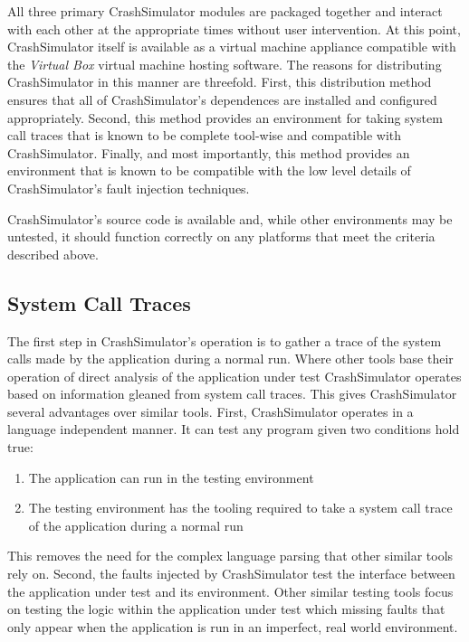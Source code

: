         All three primary CrashSimulator modules are packaged together and interact with each other at the appropriate
        times without user intervention. At this point, CrashSimulator itself is available as a virtual machine
        appliance compatible with the \emph{Virtual Box} virtual machine hosting software. The reasons for distributing
        CrashSimulator in this manner are threefold. First, this distribution method ensures that all of
        CrashSimulator's dependences are installed and configured appropriately. Second, this method provides an
        environment for taking system call traces that is known to be complete tool-wise and compatible with
        CrashSimulator. Finally, and most importantly, this method provides an environment that is known to be
        compatible with the low level details of CrashSimulator's fault injection techniques.

        CrashSimulator's source code is available and, while other environments may be untested, it should function
        correctly on any platforms that meet the criteria described above.

    \subsection{System Call Traces}


        The first step in CrashSimulator's operation is to gather a trace of the system calls made by the application
        during a normal run. Where other tools base their operation of direct analysis of the application under test
        CrashSimulator operates based on information gleaned from system call traces. This gives CrashSimulator several
        advantages over similar tools. First, CrashSimulator operates in a language independent manner. It can test any
        program given two conditions hold true:

        \begin{enumerate}
            \item{The application can run in the testing environment}
            \item{The testing environment has the tooling required to take a system call trace of the application during
            a normal run}
        \end{enumerate}

        This removes the need for the complex language parsing that other similar tools rely on. Second, the faults
        injected by CrashSimulator test the interface between the application under test and its environment. Other
        similar testing tools focus on testing the logic within the application under test which missing faults that
        only appear when the application is run in an imperfect, real world environment.

